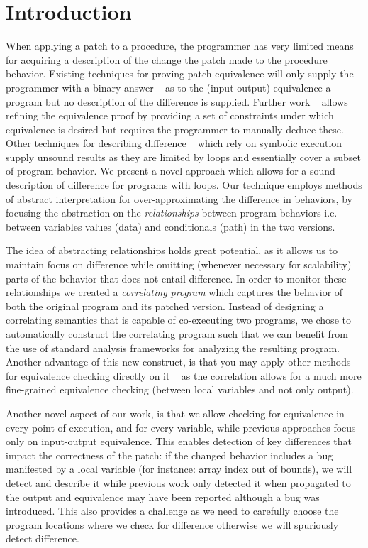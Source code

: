 \section{Introduction} 

When applying a patch to a procedure, the programmer has very limited means for acquiring a description of the change the patch made to the procedure behavior. Existing techniques for proving patch equivalence will only supply the programmer with a binary answer ~\cite{GodlinStrichman} as to the (input-output) equivalence a program but no description of the difference is supplied. Further work ~\cite{KawaguchiLahiriRebelo10} allows refining the equivalence proof by providing a set of constraints under which equivalence is desired but requires the programmer to manually deduce these. Other techniques for describing difference ~\cite{DwyerElbaumPerson08,HawblitzelKawaguchiLahiriRebelo12} which rely on symbolic execution supply unsound results as they are limited by loops and essentially cover a subset of program behavior. 
We present a novel approach which allows for a sound description of difference for programs with loops. Our technique employs methods of abstract interpretation for over-approximating the difference in behaviors, by focusing the abstraction on the \emph{relationships} between program behaviors i.e. between variables values (data) and conditionals (path) in the two versions.

The idea of abstracting relationships holds great potential, as it allows us to maintain focus on difference while omitting (whenever necessary for scalability) parts of the behavior that does not entail difference. In order to monitor these relationships we created a \emph{correlating program} which captures the behavior of both the original program and its patched version. Instead of designing a correlating semantics that is capable of co-executing two programs, we chose to automatically construct the correlating program such that we can benefit from the use of standard analysis frameworks for analyzing the resulting program. Another advantage of this new construct, is that you may apply other methods for equivalence checking directly on it ~\cite{EnglerRamos11} as the correlation allows for a much more fine-grained equivalence checking (between local variables and not only output).

Another novel aspect of our work, is that we allow checking for equivalence in every point of execution, and for every variable, while previous approaches focus only on input-output equivalence. This enables detection of key differences that impact the correctness of the patch: if the changed behavior includes a bug manifested by a local variable (for instance: array index out of bounds), we will detect and describe it while previous work only detected it when propagated to the output and equivalence may have been reported although a bug was introduced. This also provides a challenge as we need to carefully choose the program locations where we check for difference otherwise we will spuriously detect difference.

